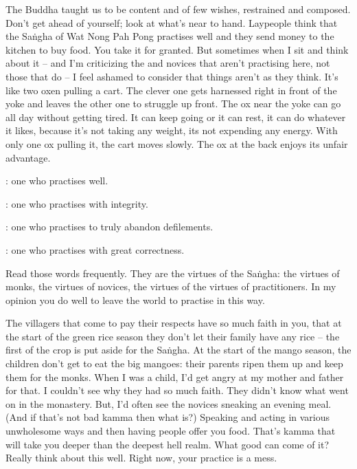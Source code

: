 The Buddha taught us to be content and of few wishes, restrained and composed. Don't get ahead of yourself; look at what's near to hand. Laypeople think that the Sa\.ngha of Wat Nong Pah Pong practises well and they send money to the kitchen to buy food. You take it for granted. But sometimes when I sit and think about it -- and I'm criticizing the  and novices that aren't practising here, not those that do -- I feel ashamed to consider that things aren't as they think. It's like two oxen pulling a cart. The clever one gets harnessed right in front of the yoke and leaves the other one to struggle up front. The ox near the yoke can go all day without getting tired. It can keep going or it can rest, it can do whatever it likes, because it's not taking any weight, its not expending any energy. With only one ox pulling it, the cart moves slowly. The ox at the back enjoys its unfair advantage.

: one who practises well.

: one who practises with integrity.

: one who practises to truly abandon defilements.

: one who practises with great correctness.

Read those words frequently. They are the virtues of the Sa\.ngha: the virtues of monks, the virtues of novices, the virtues of  the virtues of practitioners. In my opinion you do well to leave the world to practise in this way.

The villagers that come to pay their respects have so much faith in you, that at the start of the green rice season they don't let their family have any rice -- the first of the crop is put aside for the Sa\.ngha. At the start of the mango season, the children don't get to eat the big mangoes: their parents ripen them up and keep them for the monks. When I was a child, I'd get angry at my mother and father for that. I couldn't see why they had so much faith. They didn't know what went on in the monastery. But, I'd often see the novices sneaking an evening meal. (And if that's not bad kamma then what is?) Speaking and acting in various unwholesome ways and then having people offer you food. That's kamma that will take you deeper than the deepest hell realm. What good can come of it? Really think about this well. Right now, your practice is a mess.

